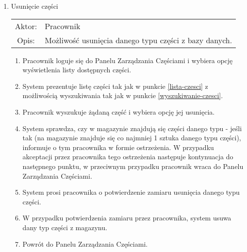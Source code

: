 \begin{enumerate}
  \item Usunięcie części \\
  \begin{tabularx}{\linewidth}{ c X }
  Aktor: & Pracownik \\
  Opis: & Możliwość usunięcia danego typu części z bazy danych.\\
  \end{tabularx}
   \begin{enumerate}
    \item Pracownik loguje się do Panelu Zarządzania Częściami i wybiera opcję wyświetlenia listy dostępnych części.
    \item System prezentuje listę części tak jak w punkcie \ref{lista-czesci} z możliwością wyszukiwania tak jak w punkcie \ref{wyszukiwanie-czesci}.
    \item Pracownik wyszukuje żądaną część i wybiera opcję jej usunięcia.
    \item System sprawdza, czy w magazynie znajdują się części danego typu - jeśli tak (na magazynie znajduje się co najmniej 1 sztuka danego typu części), informuje o tym pracownika w formie ostrzeżenia. W przypadku akceptacji przez pracownika tego ostrzeżenia następuje kontynuacja do następnego punktu, w przeciwnym przypadku pracownik wraca do Panelu Zarządzania Częściami.
    \item System prosi pracownika o potwierdzenie zamiaru usunięcia danego typu części.
    \item W przypadku potwierdzenia zamiaru przez pracownika, system usuwa dany typ części z magazynu.
    \item Powrót do Panelu Zarządzania Częściami.
  \end{enumerate}
  

\end{enumerate}
